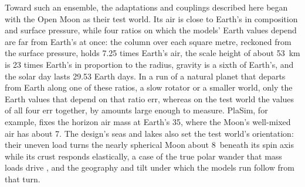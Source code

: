 Toward such an ensemble, the adaptations and couplings described here began with the Open Moon as their test
world. Its air is close to Earth's in composition and surface pressure, while four ratios on which the models'
Earth values depend are far from Earth's at once: the column over each square metre, reckoned from the surface pressure, holds 7.25 times Earth's air, the
scale height of about 53~km is 23 times Earth's in proportion to the radius, gravity is a sixth of
Earth's, and the solar day lasts 29.53 Earth days. In a run of a natural planet that departs from Earth along one of these ratios, a slow rotator or a smaller world, only the Earth values that depend on that ratio err, whereas
on the test world the values of all four err together, by amounts large enough to measure. PlaSim, for example,
fixes the horizon air mass at Earth's 35, where the Moon's well-mixed air has about 7. The design's seas and lakes
also set the test world's orientation: their uneven load turns the nearly spherical Moon about 8\textdegree\ beneath
its spin axis while its crust responds elastically, a case of the true polar wander that mass loads drive
\autocite{matsuyama2014planetary}, and the geography and tilt under which the models run follow from that
turn.

